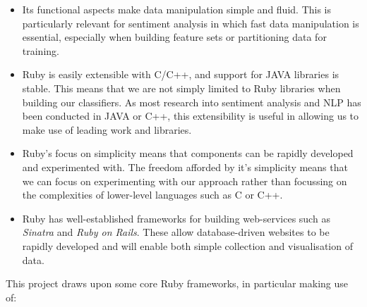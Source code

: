 \begin{itemize}
	\item Its functional aspects make data manipulation simple and fluid. This is particularly relevant for sentiment analysis in which fast data manipulation is essential, especially when building feature sets or partitioning data for training.
	\item Ruby is easily extensible with C/C++, and support for JAVA libraries is stable. This means that we are not simply limited to Ruby libraries when building our classifiers. As most research into sentiment analysis and NLP has been conducted in JAVA or C++, this extensibility is useful in allowing us to make use of leading work and libraries.
	\item Ruby's focus on simplicity means that components can be rapidly developed and experimented with. The freedom afforded by it's simplicity means that we can focus on experimenting with our approach rather than focussing on the complexities of lower-level languages such as C or C++.
	\item Ruby has well-established frameworks for building web-services such as \emph{Sinatra} and \emph{Ruby on Rails}. These allow database-driven websites to be rapidly developed and will enable both simple collection and visualisation of data.
\end{itemize}

This project draws upon some core Ruby frameworks, in particular making use of:

